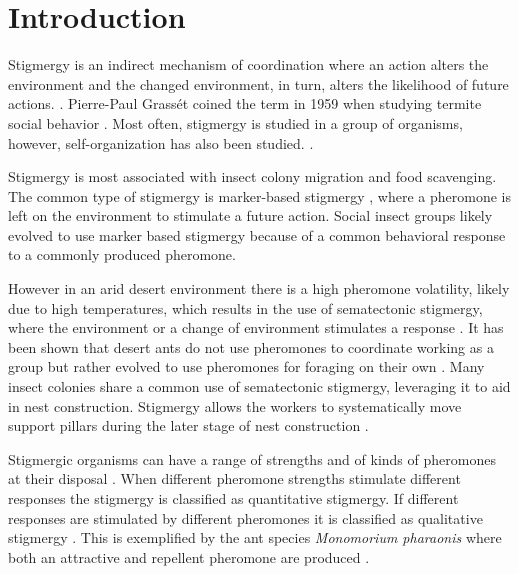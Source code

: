 \section{Introduction}

Stigmergy is an indirect mechanism of coordination where an action alters the environment and the changed environment, in turn, alters the likelihood of future actions. \cite{susi_social_2001, ahadeli_multi-agent_2004}.
Pierre-Paul Grassét coined the term in 1959 when studying termite social behavior \cite{heylighen_stigmergy_2016a}.
Most often, stigmergy is studied in a group of organisms, however, self-organization has also been studied.  \cite{heylighen_stigmergy_2016b}.

Stigmergy is most associated with insect colony migration and food scavenging.
The common type of stigmergy is marker-based stigmergy \cite{ahadeli_multi-agent_2004, heylighen_stigmergy_2016b}, where a pheromone is left on the environment to stimulate a future action.
Social insect groups likely evolved to use marker based stigmergy because of a common behavioral response to a commonly produced pheromone.

However in an arid desert environment there is a high pheromone volatility, likely due to high temperatures, which results in the use of sematectonic stigmergy, where the environment or a change of environment stimulates a response \cite{ahadeli_multi-agent_2004, heylighen_stigmergy_2016a}. It has been shown that desert ants do not use pheromones to coordinate working as a group but rather evolved to use pheromones for foraging on their own \cite{ruano_high_2000}.
Many insect colonies share a common use of sematectonic stigmergy, leveraging it to aid in nest construction. Stigmergy allows the workers to systematically move support pillars during the later stage of nest construction \cite{dorigo_ant_2000,khuong_stigmergic_2016}.

Stigmergic organisms can have a range of strengths and of kinds of pheromones at their disposal \cite{theraulaz1999brief}.
When different pheromone strengths stimulate different responses the stigmergy is classified as quantitative stigmergy. If different responses are stimulated by different pheromones it is classified as qualitative stigmergy \cite{heylighen_stigmergy_2016b}.
This is exemplified by the ant species \textit{Monomorium pharaonis} where both an attractive and repellent pheromone are produced \cite{jeanson_pheromone_2003}.

